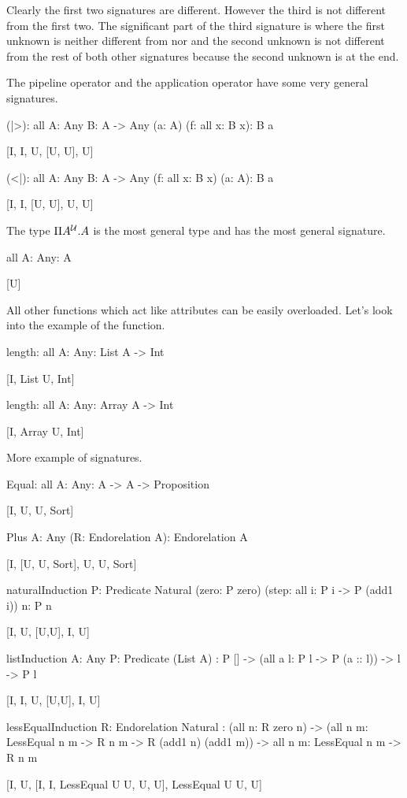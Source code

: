 Clearly the first two signatures are different. However the third is not
different from the first two. The significant part of the third signature is
\code{[U, U]} where the first unknown is neither different from  nor
 and the second unknown is not different from the rest of both
other signatures because the second unknown is at the end.

The pipeline operator \code{|>} and the application operator \code{<|} have some
very general signatures.
\begin{alba}
    (|>): all {A: Any} {B: A -> Any} (a: A) (f: all x: B x): B a

        [I, I, U, [U, U], U]


    (<|): all {A: Any} {B: A -> Any} (f: all x: B x) (a: A): B a

        [I, I, [U, U], U, U]
\end{alba}

The type $\Pi A^{\cal{U}}. A$ is the most general type and has the most general
signature.
\begin{alba}
    all {A: Any}: A

        [U]
\end{alba}



All other functions which act like attributes can be easily overloaded. Let's
look into the example of the  function.

\begin{alba}
    length: all {A: Any}: List A -> Int

        [I, List U, Int]


    length: all {A: Any}: Array A -> Int

        [I, Array U, Int]
\end{alba}

More example of signatures.
%
\begin{alba}

    Equal: all {A: Any}: A -> A -> Proposition

        [I, U, U, Sort]


    Plus {A: Any} (R: Endorelation A): Endorelation A

        [I, [U, U, Sort], U, U, Sort]


    naturalInduction
        {P: Predicate Natural}
        (zero: P zero) (step: all {i}: P i -> P (add1 i))
        {n}: P n

        [I, U, [U,U], I, U]


    listInduction
        {A: Any} {P: Predicate (List A)}
        : P [] -> (all {a l}: P l -> P (a :: l)) -> {l} -> P l

        [I, I, U, [U,U], I, U]


    lessEqualInduction {R: Endorelation Natural}
        :   (all {n}: R zero n)
            -> (all {n m}: LessEqual n m -> R n m -> R (add1 n) (add1 m))
            -> all {n m}: LessEqual n m -> R n m

        [I, U, [I, I, LessEqual U U, U, U], LessEqual U U, U]
\end{alba}

